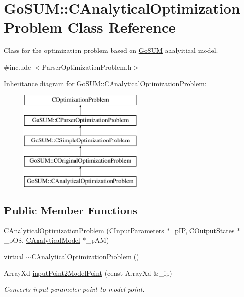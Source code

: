 \hypertarget{class_go_s_u_m_1_1_c_analytical_optimization_problem}{\section{Go\-S\-U\-M\-:\-:C\-Analytical\-Optimization\-Problem Class Reference}
\label{class_go_s_u_m_1_1_c_analytical_optimization_problem}
}


Class for the optimization problem based on \hyperlink{struct_go_s_u_m}{Go\-S\-U\-M} analyitical model.  




{\ttfamily \#include $<$Parser\-Optimization\-Problem.\-h$>$}

Inheritance diagram for Go\-S\-U\-M\-:\-:C\-Analytical\-Optimization\-Problem\-:\begin{figure}[H]
\begin{center}
\leavevmode
\includegraphics[height=5.000000cm]{class_go_s_u_m_1_1_c_analytical_optimization_problem}
\end{center}
\end{figure}
\subsection*{Public Member Functions}
\begin{DoxyCompactItemize}
\item 
\hyperlink{class_go_s_u_m_1_1_c_analytical_optimization_problem_a9bf7781536fcc8efc62d379aee03676f}{C\-Analytical\-Optimization\-Problem} (\hyperlink{class_go_s_u_m_1_1_c_input_parameters}{C\-Input\-Parameters} $\ast$\-\_\-p\-I\-P, \hyperlink{class_go_s_u_m_1_1_c_output_states}{C\-Output\-States} $\ast$\-\_\-p\-O\-S, \hyperlink{class_go_s_u_m_1_1_c_analytical_model}{C\-Analytical\-Model} $\ast$\-\_\-p\-A\-M)
\item 
virtual \hyperlink{class_go_s_u_m_1_1_c_analytical_optimization_problem_a5b6040cd5cf69ad24e076ce23152fedb}{$\sim$\-C\-Analytical\-Optimization\-Problem} ()
\item 
Array\-Xd \hyperlink{class_go_s_u_m_1_1_c_analytical_optimization_problem_a83cf54606759ec8e5cb20cbb0b0ce6f5}{input\-Point2\-Model\-Point} (const Array\-Xd \&\-\_\-ip)
\begin{DoxyCompactList}\small\item\em Converts input parameter point to model point. \end{DoxyCompactList}\end{DoxyCompactItemize}
